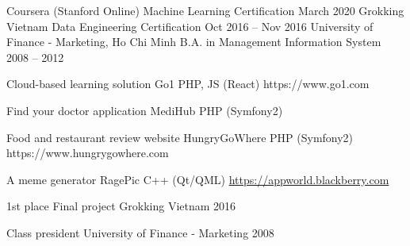 \documentclass[]{awesome-cv}
\begin{document}
\begin{cventries}
	\cventry
	{Coursera (Stanford Online)}
	{Machine Learning Certification}
	{}
	{March 2020}
	{}
	\cventry
	{Grokking Vietnam}
	{Data Engineering Certification}
	{}
	{Oct 2016 – Nov 2016}
	{}
	\cventry
	{University of Finance - Marketing, Ho Chi Minh}
	{B.A. in Management Information System}
	{}
	{2008 – 2012}
	{}
\end{cventries}
\vspace{-2mm}

\vspace{-7mm}
\begin{cventries}
	\cventry
	{Cloud-based learning solution}
	{Go1}
	{PHP, JS (React)}
	{https://www.go1.com}
	{}

	\vspace{-5mm}
	\cventry
	{Find your doctor application}
	{MediHub}
	{PHP (Symfony2)}
	{}
	{}

	\vspace{-5mm}
	\cventry
	{Food and restaurant review website}
	{HungryGoWhere}
	{PHP (Symfony2)}
	{https://www.hungrygowhere.com}
	{}

	\vspace{-5mm}
	\cventry
	{A meme generator}
	{RagePic}
	{C++ (Qt/QML)}
	{\href{https://appworld.blackberry.com/webstore/content/20401932}{https://appworld.blackberry.com}}
	{}

	\vspace{-5mm}
\end{cventries}
\begin{cvhonors}
	\cvhonor
	{1st place}
	{Final project}
	{Grokking Vietnam}
	{2016}

	\cvhonor
	{Class president}
	{University of Finance - Marketing}
	{}
	{2008}
\end{cvhonors}
\ 
\end{document}

